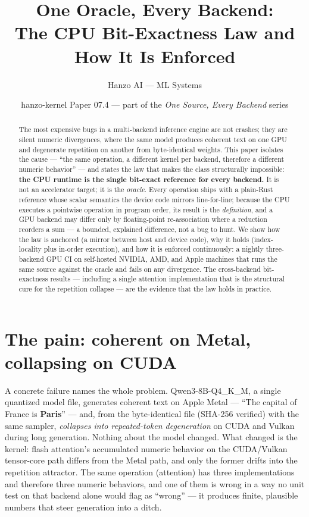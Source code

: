 \documentclass[11pt]{article}
\title{\textbf{One Oracle, Every Backend:\\ The CPU Bit-Exactness Law and How It Is Enforced}}
\author{Hanzo AI --- ML Systems}
\date{hanzo-kernel Paper 07.4 --- part of the \emph{One Source, Every Backend} series}
\begin{document}
\maketitle

\begin{abstract}
The most expensive bugs in a multi-backend inference engine are not crashes; they are silent numeric
divergences, where the same model produces coherent text on one GPU and degenerate repetition on another
from byte-identical weights. This paper isolates the cause --- ``the same operation, a different kernel
per backend, therefore a different numeric behavior'' --- and states the law that makes the class
structurally impossible: \textbf{the CPU runtime is the single bit-exact reference for every backend.} It
is not an accelerator target; it is the \emph{oracle}. Every operation ships with a plain-Rust reference
whose scalar semantics the device code mirrors line-for-line; because the CPU executes a pointwise
operation in program order, its result is the \emph{definition}, and a GPU backend may differ only by
floating-point re-association where a reduction reorders a sum --- a bounded, explained difference, not a
bug to hunt. We show how the law is anchored (a mirror between host and device code), why it holds
(index-locality plus in-order execution), and how it is enforced continuously: a nightly three-backend
GPU CI on self-hosted NVIDIA, AMD, and Apple machines that runs the same source against the oracle and
fails on any divergence. The cross-backend bit-exactness results --- including a single attention
implementation that is the structural cure for the repetition collapse --- are the evidence that the law
holds in practice.
\end{abstract}

\section{The pain: coherent on Metal, collapsing on CUDA}
\label{sec:pain}

A concrete failure names the whole problem. Qwen3-8B-Q4\_K\_M, a single quantized model file, generates
coherent text on Apple Metal --- ``The capital of France is \textbf{Paris}'' --- and, from the
byte-identical file (SHA-256 verified) with the same sampler, \emph{collapses into repeated-token
degeneration} on CUDA and Vulkan during long generation. Nothing about the model changed. What changed is
the kernel: flash attention's accumulated numeric behavior on the CUDA/Vulkan tensor-core path differs
from the Metal path, and only the former drifts into the repetition attractor. The same operation
(attention) has three implementations and therefore three numeric behaviors, and one of them is wrong in
a way no unit test on that backend alone would flag as ``wrong'' --- it produces finite, plausible
numbers that steer generation into a ditch.
\end{document}
